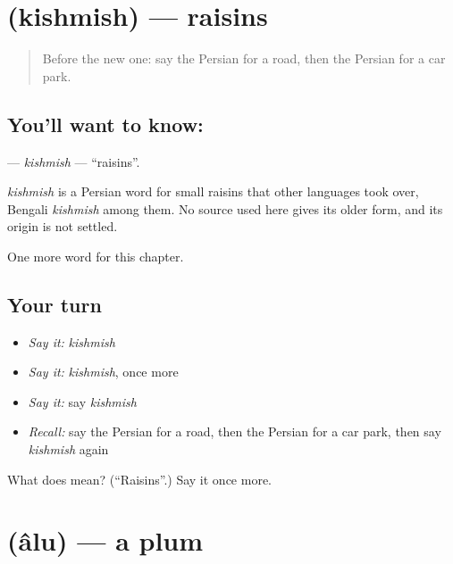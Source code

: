 \section[\texorpdfstring{\fa{کشمش} (kishmish)}{کشمش (kishmish)}]{ (kishmish) — raisins}

\label{lesson:FA-C118-kishmish}



\begin{quote}
Before the new one: say the Persian for a road, then the Persian for a car park.
\end{quote}

\subsection*{You'll want to know: }
\textbf{} — \emph{kishmish} — \textquotedblleft{}raisins\textquotedblright{}.

\begin{cousinweb}
\emph{kishmish} is a Persian word for small raisins that other languages took over, Bengali \emph{kishmish} among them. No source used here gives its older form, and its origin is not settled.
\end{cousinweb}

\begin{grammarlens}[title={What you've built}]
One more word for this chapter.
\end{grammarlens}

\subsection*{Your turn}
\begin{itemize}
\raggedright
  \item \emph{Say it:} \emph{kishmish}
  \item \emph{Say it:} \emph{kishmish}, once more
  \item \emph{Say it:} say \emph{kishmish}
  \item \emph{Recall:} say the Persian for a road, then the Persian for a car park, then say \emph{kishmish} again
\end{itemize}

\begin{tcolorbox}[breakable,colback=teal!4,colframe=teal!35!black,title={Before you move on}]
What does  mean? (\textquotedblleft{}Raisins\textquotedblright{}.) Say it once more.
\end{tcolorbox}
\section[\texorpdfstring{\fa{آلو} (âlu)}{آلو (âlu)}]{ (âlu) — a plum}


